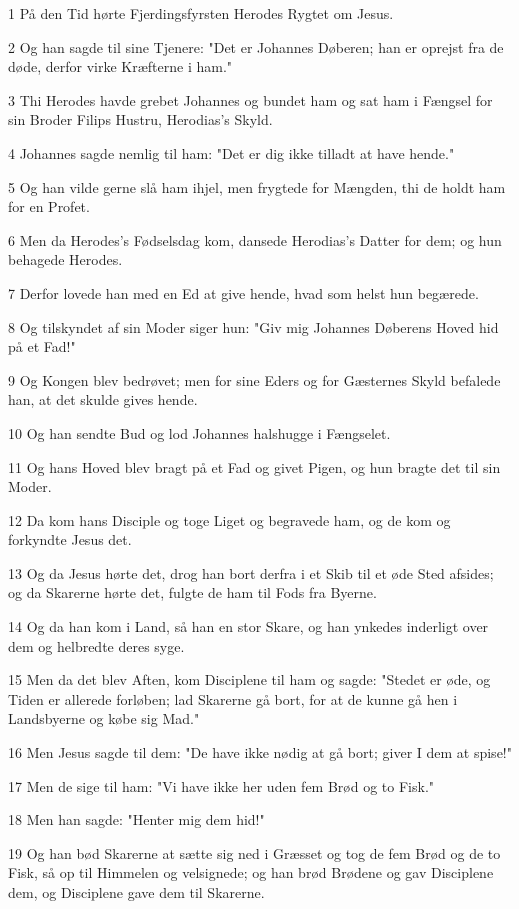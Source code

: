 \par 1 På den Tid hørte Fjerdingsfyrsten Herodes Rygtet om Jesus.
\par 2 Og han sagde til sine Tjenere: "Det er Johannes Døberen; han er oprejst fra de døde, derfor virke Kræfterne i ham."
\par 3 Thi Herodes havde grebet Johannes og bundet ham og sat ham i Fængsel for sin Broder Filips Hustru, Herodias's Skyld.
\par 4 Johannes sagde nemlig til ham: "Det er dig ikke tilladt at have hende."
\par 5 Og han vilde gerne slå ham ihjel, men frygtede for Mængden, thi de holdt ham for en Profet.
\par 6 Men da Herodes's Fødselsdag kom, dansede Herodias's Datter for dem; og hun behagede Herodes.
\par 7 Derfor lovede han med en Ed at give hende, hvad som helst hun begærede.
\par 8 Og tilskyndet af sin Moder siger hun: "Giv mig Johannes Døberens Hoved hid på et Fad!"
\par 9 Og Kongen blev bedrøvet; men for sine Eders og for Gæsternes Skyld befalede han, at det skulde gives hende.
\par 10 Og han sendte Bud og lod Johannes halshugge i Fængselet.
\par 11 Og hans Hoved blev bragt på et Fad og givet Pigen, og hun bragte det til sin Moder.
\par 12 Da kom hans Disciple og toge Liget og begravede ham, og de kom og forkyndte Jesus det.
\par 13 Og da Jesus hørte det, drog han bort derfra i et Skib til et øde Sted afsides; og da Skarerne hørte det, fulgte de ham til Fods fra Byerne.
\par 14 Og da han kom i Land, så han en stor Skare, og han ynkedes inderligt over dem og helbredte deres syge.
\par 15 Men da det blev Aften, kom Disciplene til ham og sagde: "Stedet er øde, og Tiden er allerede forløben; lad Skarerne gå bort, for at de kunne gå hen i Landsbyerne og købe sig Mad."
\par 16 Men Jesus sagde til dem: "De have ikke nødig at gå bort; giver I dem at spise!"
\par 17 Men de sige til ham: "Vi have ikke her uden fem Brød og to Fisk."
\par 18 Men han sagde: "Henter mig dem hid!"
\par 19 Og han bød Skarerne at sætte sig ned i Græsset og tog de fem Brød og de to Fisk, så op til Himmelen og velsignede; og han brød Brødene og gav Disciplene dem, og Disciplene gave dem til Skarerne.
